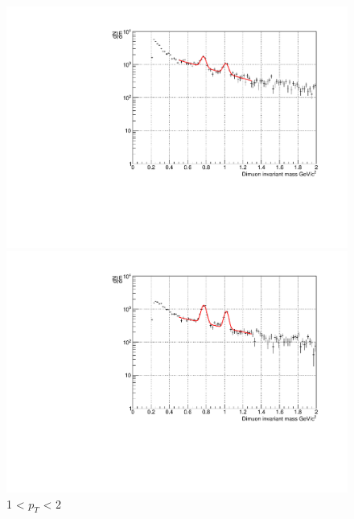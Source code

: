                 \begin{figure}[htbp]
                    \centering
                    \begin{minipage}{0.45\textwidth}
                        \centering
                        \includegraphics[width=\textwidth]{fig/3_4_2_fit_pt_1to2.pdf}
                        \captionsetup{labelformat=empty}
                        \caption{1 < $p_{T}$ < 2}
                        \label{Analysis:Dimuon:Yield:fit_1to2}
                    \end{minipage}
                    \hfill
                    \begin{minipage}{0.45\textwidth}
                        \centering
                        \includegraphics[width=\textwidth]{fig/3_4_2_fit_pt_2to3.pdf}
                        \captionsetup{labelformat=empty}

\end{minipage}
\end{figure}
